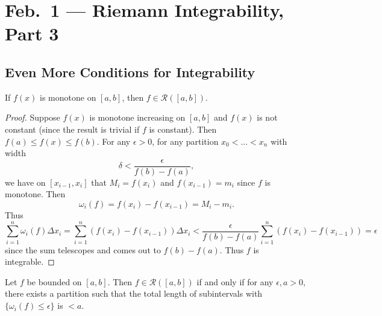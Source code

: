 \chapter{Feb.~1 --- Riemann Integrability, Part 3}

\section{Even More Conditions for Integrability}
\begin{example}
  If $f(x)$ is monotone on $[a, b]$, then
  $f \in \mathcal{R}([a, b])$.
\end{example}

\begin{proof}
  Suppose $f(x)$ is monotone increasing on
  $[a, b]$ and $f(x)$ is not constant (since the result
  is trivial if $f$ is constant). Then
  $f(a) \le f(x) \le f(b)$. For any $\epsilon > 0$,
  for any partition $x_0 < \dots < x_n$ with width
  \[
    \delta < \frac{\epsilon}{f(b) - f(a)},
  \]
  we have on $[x_{i - 1}, x_i]$ that
  $M_i = f(x_i)$ and $f(x_{i - 1}) = m_i$ since
  $f$ is monotone. Then
  \[
    \omega_i(f) = f(x_i) - f(x_{i - 1}) = M_i - m_i.
  \]
  Thus
  \[
    \sum_{i = 1}^n \omega_i(f) \Delta x_i
    = \sum_{i = 1}^n (f(x_i) - f(x_{i - 1})) \Delta x_i
    < \frac{\epsilon}{f(b) - f(a)} \sum_{i = 1}^n (f(x_i) - f(x_{i - 1})) = \epsilon
  \]
  since the sum telescopes and comes out to
  $f(b) - f(a)$. Thus $f$ is integrable.
\end{proof}

\begin{theorem}
  Let $f$ be bounded on $[a, b]$. Then $f \in \mathcal{R}([a, b])$
  if and only if for any $\epsilon, a > 0$,
  there exists a partition such that
  the total length of subintervals with
  $\{\omega_i(f) \le \epsilon\}$ is $< a$.
\end{theorem}

